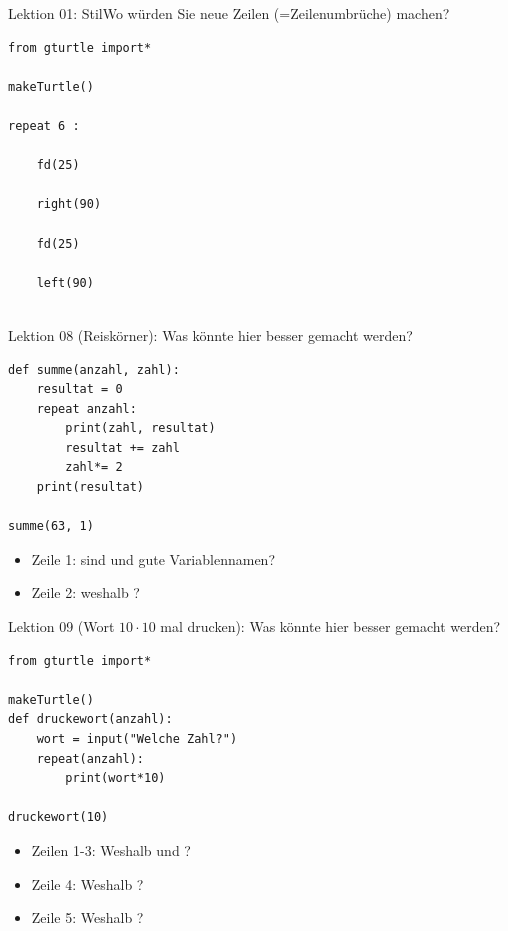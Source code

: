 \begin{frame}[fragile]{Lektion 01: Stil}{Wo würden Sie neue Zeilen (=Zeilenumbrüche) machen?}
\begin{lstlisting}[style=TigerJython]
from gturtle import*

makeTurtle()

repeat 6 :

    fd(25)
    
    right(90)
    
    fd(25)
    
    left(90)
    
\end{lstlisting}

\end{frame}

\begin{frame}[fragile]{Lektion 08}
 (Reiskörner): Was könnte hier besser gemacht werden?
\begin{lstlisting}[style=TigerJython]
def summe(anzahl, zahl):
    resultat = 0
    repeat anzahl:
        print(zahl, resultat)
        resultat += zahl
        zahl*= 2
    print(resultat)
    
summe(63, 1)
\end{lstlisting}
\begin{itemize}
    \item Zeile 1: sind  und  gute Variablennamen?
    \item Zeile 2: weshalb ?
\end{itemize}
\end{frame}

\begin{frame}[fragile]{Lektion 09}
 (Wort $10\cdot 10$ mal drucken): Was könnte hier besser gemacht werden?
\begin{lstlisting}[style=TigerJython]
from gturtle import*

makeTurtle()
def druckewort(anzahl):
    wort = input("Welche Zahl?")
    repeat(anzahl):
        print(wort*10)
        
druckewort(10)
\end{lstlisting}
\begin{itemize}
    \item Zeilen 1-3: Weshalb  und ?
    \item Zeile 4: Weshalb ?
    \item Zeile 5: Weshalb ?
\end{itemize}
\end{frame}


